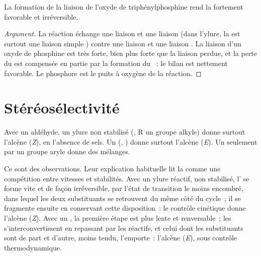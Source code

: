 \begin{proposition}\label{prop:b2:wittig:driving}
La formation de la liaison  de l'oxyde de triphénylphosphine rend la 
fortement favorable et irréversible.
\end{proposition}

\begin{proof}[Argument]
La réaction échange une liaison  et une liaison  (dans l'ylure, la  est
surtout une liaison simple ) contre une liaison  et une liaison . La liaison
 d'un oxyde de phosphine est très forte, bien plus forte que la liaison  perdue, et la
perte du  est compensée en partie par la formation du ~: le bilan est nettement
favorable. Le phosphore est le puits à oxygène de la réaction.
\end{proof}

\section{Stéréosélectivité}

\begin{proposition}\label{prop:b2:wittig:stereo}
Avec un aldéhyde, un ylure non stabilisé (, R un groupe alkyle) donne surtout l'alcène
(\textit{Z}), en l'absence de sels. Un  (, ) donne
surtout l'alcène (\textit{E}). Un  seulement par un groupe aryle donne des mélanges.
\end{proposition}

\admitted

Ce sont des observations. Leur explication habituelle lit la  comme une compétition
entre vitesses et stabilités. Avec un ylure réactif, non stabilisé, l' se forme vite et
de façon irréversible, par l'état de transition le moins encombré, dans lequel les deux substituants se
retrouvent du même côté du cycle~; il se fragmente ensuite en conservant cette disposition~: le contrôle
cinétique donne l'alcène (\textit{Z}). Avec un , la première étape est plus lente et
renversable~; les  s'interconvertissent en repassant par les réactifs, et celui dont les
substituants sont de part et d'autre, moins tendu, l'emporte~: l'alcène (\textit{E}), sous contrôle
thermodynamique.

